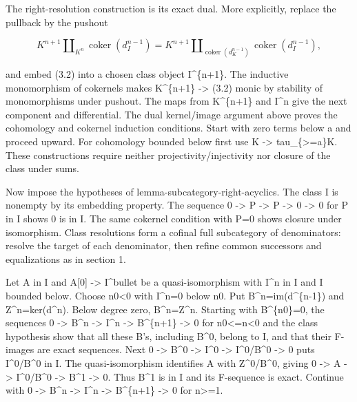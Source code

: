\documentclass[11pt]{article}
\begin{document}
The right-resolution construction is its exact dual. More explicitly,\allowbreak{} replace the pullback by the pushout

\[
 K^{n+1}\mathbin{\amalg}_{K^n}\operatorname{coker}(d_I^{n-1})
 =K^{n+1}\mathbin{\amalg}_{\operatorname{coker}(d_K^{n-1})}
                         \operatorname{coker}(d_I^{n-1}),       \tag{3.2}
\]

and embed (3.2)\allowbreak{} into a chosen class object I\textasciicircum{}\{n\allowbreak{}+1\}. The inductive monomorphism of cokernels makes K\textasciicircum{}\{n\allowbreak{}+1\} \allowbreak{}-> (3.2)\allowbreak{} monic by stability of monomorphisms under pushout. The maps from K\textasciicircum{}\{n\allowbreak{}+1\} and I\^{}n give the next component and differential. The dual kernel/\allowbreak{}image argument above proves the cohomology and cokernel induction conditions. Start with zero terms below a and proceed upward. For cohomology bounded below first use K \allowbreak{}-> tau\_\allowbreak{}\{>\allowbreak{}=a\}K. These constructions require neither projectivity/\allowbreak{}injectivity nor closure of the class under sums.

Now impose the hypotheses of lemma-subcategory-right-acyclics. The class I is nonempty by its embedding property. The sequence 0 \allowbreak{}-> P \allowbreak{}-> P \allowbreak{}-> 0 \allowbreak{}-> 0 for P in I shows 0 is in I. The same cokernel condition with P\allowbreak{}=0 shows closure under isomorphism. Class resolutions form a cofinal full subcategory of denominators:\allowbreak{} resolve the target of each denominator,\allowbreak{} then refine common successors and equalizations as in section 1.

Let A in I and A[0]\allowbreak{} \allowbreak{}-> I\^{}bullet be a quasi-isomorphism with I\^{}n in I and I bounded below. Choose n0\textless0 with I\textasciicircum{}n\allowbreak{}=0 below n0. Put B\textasciicircum{}n\allowbreak{}=im(d\textasciicircum{}\{n-1\})\allowbreak{} and Z\textasciicircum{}n\allowbreak{}=ker(d\textasciicircum{}n)\allowbreak{}. Below degree zero,\allowbreak{} B\textasciicircum{}n\allowbreak{}=Z\textasciicircum{}n. Starting with B\textasciicircum{}\{n0\}\allowbreak{}=0,\allowbreak{} the sequences 0 \allowbreak{}-> B\^{}n \allowbreak{}-> I\^{}n \allowbreak{}-> B\textasciicircum{}\{n\allowbreak{}+1\} \allowbreak{}-> 0 for n0<\allowbreak{}=n<0 and the class hypothesis show that all these B's,\allowbreak{} including B\textasciicircum{}0,\allowbreak{} belong to I,\allowbreak{} and that their F-images are exact sequences. Next 0 \allowbreak{}-> B\^{}0 \allowbreak{}-> I\^{}0 \allowbreak{}-> I\textasciicircum{}0/\allowbreak{}B\textasciicircum{}0 \allowbreak{}-> 0 puts I\textasciicircum{}0/\allowbreak{}B\textasciicircum{}0 in I. The quasi-isomorphism identifies A with Z\textasciicircum{}0/\allowbreak{}B\textasciicircum{}0,\allowbreak{} giving 0 \allowbreak{}-> A \allowbreak{}-> I\textasciicircum{}0/\allowbreak{}B\textasciicircum{}0 \allowbreak{}-> B\^{}1 \allowbreak{}-> 0. Thus B\^{}1 is in I and its F-sequence is exact. Continue with 0 \allowbreak{}-> B\^{}n \allowbreak{}-> I\^{}n \allowbreak{}-> B\textasciicircum{}\{n\allowbreak{}+1\} \allowbreak{}-> 0 for n>\allowbreak{}=1.
\end{document}
